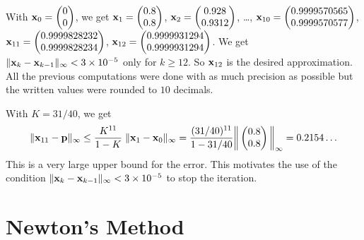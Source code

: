 \begin{egg}
With $\mathbf{x}_0 = \begin{pmatrix} 0 \\ 0 \end{pmatrix}$, we get
$\displaystyle \mathbf{x}_1 = \begin{pmatrix} 0.8 \\ 0.8 \end{pmatrix}$,
$\displaystyle \mathbf{x}_2 = \begin{pmatrix} 0.928 \\ 0.9312 \end{pmatrix}$,
\ldots ,
$\displaystyle \mathbf{x}_{10} = \begin{pmatrix} 0.9999570565 \\
0.9999570577 \end{pmatrix}$,
$\displaystyle \mathbf{x}_{11} = \begin{pmatrix} 0.9999828232 \\
0.9999828234 \end{pmatrix}$,
$\displaystyle \mathbf{x}_{12} = \begin{pmatrix} 0.9999931294 \\
0.9999931294 \end{pmatrix}$.
We get $\|\mathbf{x}_k - \mathbf{x}_{k-1}\|_\infty < 3\times 10^{-5}$
only for $k\geq 12$.  So $\mathbf{x}_{12}$ is the desired approximation.
All the previous computations were done with as much precision as
possible but the written values were rounded to $10$ decimals.

With $K= 31/40$, we get
\[
\| \mathbf{x}_{11} - \mathbf{p} \|_\infty \leq \frac{K^{11}}{1-K}\;
\| \mathbf{x}_1 - \mathbf{x}_0 \|_\infty
= \frac{(31/40)^{11}}{1- 31/40} 
\bigg\|\begin{pmatrix}
0.8 \\ 0.8
\end{pmatrix}\bigg\|_{\infty}
= 0.2154\ldots
\]
This is a very large upper bound for the error.  This motivates the use
of the condition
\mbox{$\|\mathbf{x}_k - \mathbf{x}_{k-1}\|_\infty < 3\times 10^{-5}$}
to stop the iteration.
\end{egg}

\section{Newton's Method}

